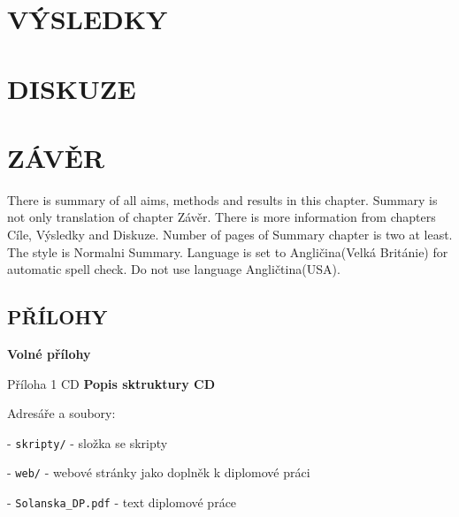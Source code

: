 \documentclass{thesisKGI}
\begin{document}
    \newpage
    \section{VÝSLEDKY}

    \newpage
    \section{DISKUZE}

    \newpage
    \section{ZÁVĚR}



    \begin{summary}
      There is summary of all aims, methods and results in this chapter.
      Summary is not only translation of chapter Závěr. There is more
      information from chapters Cíle, Výsledky and Diskuze. Number of
      pages of Summary chapter is two at least. The style is Normalni
      Summary. Language is set to Angličina(Velká Británie) for automatic
      spell check. Do not use language Angličtina(USA). 
    \end{summary}

    \newpage
    \vspace*{180pt}
    \begin{center}
    \section*{PŘÍLOHY}
    \end{center}
    \vspace*{\fill}

    \newpage
    \begin{prilohy}
      \textbf{Volné přílohy}

      Příloha 1 CD \newline
      \newline
      \textbf{Popis sktruktury CD}

        Adresáře a soubory:

        - \texttt{skripty\slash} - složka se skripty

        - \texttt{web\slash} - webové stránky jako doplněk k diplomové práci

        - \texttt{Solanska\_DP.pdf} - text diplomové práce

      \vspace*{\fill}
  \end{prilohy}
      
  
\end{document}
